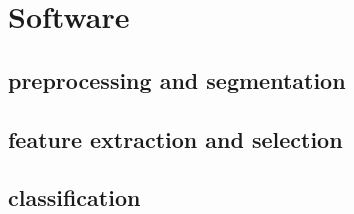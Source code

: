\section{Software}

\subsection{preprocessing and segmentation}

\subsection{feature extraction and selection}

\subsection{classification}



